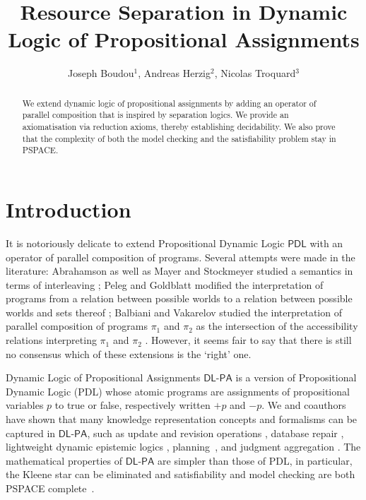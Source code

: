 \documentclass{llncs}
\title{Resource Separation in Dynamic Logic of Propositional Assignments }
\author{Joseph Boudou$^1$, Andreas Herzig$^2$, Nicolas Troquard$^3$}
\institute{
  IRIT, University of Toulouse, France \and
  IRIT, CNRS, France \and
  Free University of Bozen-Bolzano, Italy 
}
\newcommand{\Dlpa}{\ensuremath{\mathsf{DL\text{-}PA}}\xspace}
\newcommand{\Pdl}{\ensuremath{\mathsf{PDL}}\xspace}
\newcommand{\assgntop}[1]{{\mathtt {+} #1}}
\newcommand{\assgnbot}[1]{{\mathtt {-} #1}}
\begin{document}
\maketitle

\begin{abstract}
We extend dynamic logic of propositional assignments by adding an operator of parallel composition that is inspired by separation logics. 
We provide an axiomatisation via reduction axioms, thereby establishing decidability. 
We also prove that the complexity of both the model checking and the satisfiability problem stay in PSPACE.
\end{abstract}


\section{Introduction}

It is notoriously delicate to extend Propositional Dynamic Logic \Pdl with an operator of parallel composition of programs. 
Several attempts were made in the literature:
Abrahamson as well as Mayer and Stockmeyer studied a semantics in terms of interleaving \cite{Abrahamson80,MayerS96}; 
Peleg and Goldblatt modified the interpretation of programs from a relation between possible worlds to a relation between
possible worlds and sets thereof \cite{Peleg87,Goldblatt92}; 
Balbiani and Vakarelov studied the interpretation of parallel composition of programs $\pi_1$ and $\pi_2$ as 
the intersection of the accessibility relations interpreting $\pi_1$ and $\pi_2$ \cite{BalbianiV03}. 
However, it seems fair to say that there is still no consensus which of these extensions is the `right' one. 

Dynamic Logic of Propositional Assignments \Dlpa \cite{BalbianiHerzigTroquard-Lics13,BalbianiHST14} 
is a version of Propositional Dynamic Logic (PDL) whose atomic programs are 
assignments of propositional variables $p$ to true or false, respectively written $\assgntop p$ and $\assgnbot p$. 
We and coauthors have shown that many knowledge representation concepts and formalisms can be captured in \Dlpa, such as 
update and revision operations \cite{Herzig-Kr14}, 
database %
repair 
\cite{%
FeuilladeHR19}, 
lightweight dynamic epistemic logics \cite{DBLP:conf/atal/CharrierS15,CooperHMMR16,DBLP:conf/atal/CharrierS17},
planning~\cite{HerzigEtal-Ecai14}, and
judgment aggregation \cite{DBLP:journals/logcom/NovaroGH18}. 
The mathematical properties of \Dlpa are simpler than those of PDL, in particular, 
the Kleene star can be eliminated \cite{BalbianiHerzigTroquard-Lics13} and 
satisfiability and model checking are both PSPACE complete~\cite{BalbianiHST14}. 
\end{document}

